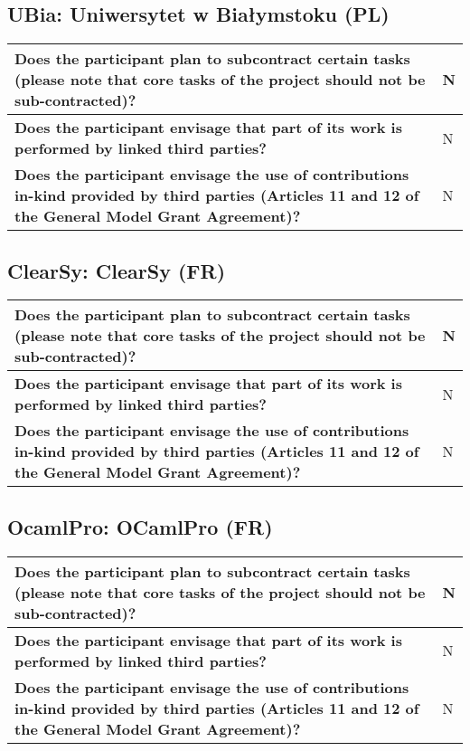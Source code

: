 \subsection{UBia: Uniwersytet w Białymstoku (PL)}

\begin{longtable}{|p{}|p{}|}
\hline
{\bf Does the participant plan to subcontract certain tasks (please
  note that core tasks of the project should not be sub-contracted)?}
&
N
\\
\hline
{\bf Does the participant envisage that  part of its work is performed
  by linked third parties?}
&
N
\\
\hline
{\bf Does the participant envisage the use of contributions in-kind
provided by third parties (Articles 11 and 12 of the General Model
Grant Agreement)?}
&
N
\\
\hline
\end{longtable}


\subsection{ClearSy: ClearSy (FR)}

\begin{longtable}{|p{}|p{}|}
\hline
{\bf Does the participant plan to subcontract certain tasks (please
  note that core tasks of the project should not be sub-contracted)?}
&
N
\\
\hline
{\bf Does the participant envisage that  part of its work is performed
  by linked third parties?}
&
N
\\
\hline
{\bf Does the participant envisage the use of contributions in-kind
provided by third parties (Articles 11 and 12 of the General Model
Grant Agreement)?}
&
N
\\
\hline
\end{longtable}


\subsection{OcamlPro: OCamlPro (FR)}

\begin{longtable}{|p{}|p{}|}
\hline
{\bf Does the participant plan to subcontract certain tasks (please
  note that core tasks of the project should not be sub-contracted)?}
&
N
\\
\hline
{\bf Does the participant envisage that  part of its work is performed
  by linked third parties?}
&
N
\\
\hline
{\bf Does the participant envisage the use of contributions in-kind
provided by third parties (Articles 11 and 12 of the General Model
Grant Agreement)?}
&
N
\\
\hline
\end{longtable}


